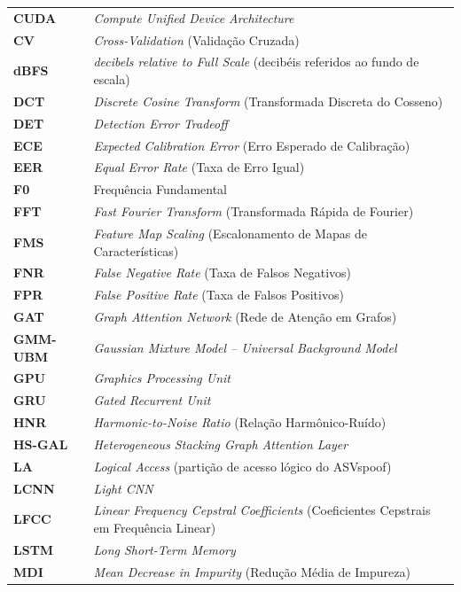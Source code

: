 \documentclass[12pt,a4paper]{article}
\begin{document}
\begin{longtable}{@{}>{\raggedright\arraybackslash}p{2.5cm}
		>{\raggedright\arraybackslash}p{11.3cm}@{}}
	\textbf{CUDA}    & \textit{Compute Unified Device Architecture} \\
	\textbf{CV}      & \textit{Cross-Validation} (Validação Cruzada) \\
	\textbf{dBFS}    & \textit{decibels relative to Full Scale} (decibéis referidos ao fundo de escala) \\
	\textbf{DCT}     & \textit{Discrete Cosine Transform} (Transformada Discreta do Cosseno) \\
	\textbf{DET}     & \textit{Detection Error Tradeoff} \\
	\textbf{ECE}     & \textit{Expected Calibration Error} (Erro Esperado de Calibração) \\
	\textbf{EER}     & \textit{Equal Error Rate} (Taxa de Erro Igual) \\
	\textbf{F0}      & Frequência Fundamental \\
	\textbf{FFT}     & \textit{Fast Fourier Transform} (Transformada Rápida de Fourier) \\
	\textbf{FMS}     & \textit{Feature Map Scaling} (Escalonamento de Mapas de Características) \\
	\textbf{FNR}     & \textit{False Negative Rate} (Taxa de Falsos Negativos) \\
	\textbf{FPR}     & \textit{False Positive Rate} (Taxa de Falsos Positivos) \\
	\textbf{GAT}     & \textit{Graph Attention Network} (Rede de Atenção em Grafos) \\
	\textbf{GMM-UBM} & \textit{Gaussian Mixture Model -- Universal Background Model} \\
	\textbf{GPU}     & \textit{Graphics Processing Unit} \\
	\textbf{GRU}     & \textit{Gated Recurrent Unit} \\
	\textbf{HNR}     & \textit{Harmonic-to-Noise Ratio} (Relação Harmônico-Ruído) \\
	\textbf{HS-GAL}  & \textit{Heterogeneous Stacking Graph Attention Layer} \\
	\textbf{LA}      & \textit{Logical Access} (partição de acesso lógico do ASVspoof) \\
	\textbf{LCNN}    & \textit{Light CNN} \\
	\textbf{LFCC}    & \textit{Linear Frequency Cepstral Coefficients} (Coeficientes Cepstrais em Frequência Linear) \\
	\textbf{LSTM}    & \textit{Long Short-Term Memory} \\
	\textbf{MDI}     & \textit{Mean Decrease in Impurity} (Redução Média de Impureza) \\

\end{longtable}
\end{document}
